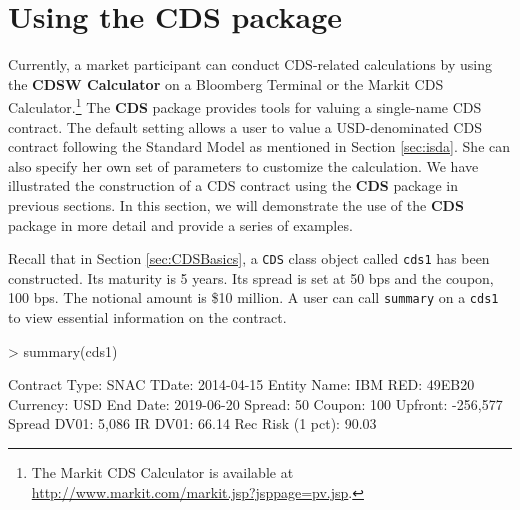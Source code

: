 \documentclass[a4paper]{article}
\renewenvironment{Schunk}{\vspace{\topsep}}{\vspace{\topsep}}
\begin{document}
\section{Using the CDS package}

Currently, a market participant can conduct CDS-related calculations
by using the \textbf{CDSW Calculator} on a Bloomberg Terminal or the
Markit CDS Calculator.\footnote{The Markit CDS Calculator is available
  at \url{http://www.markit.com/markit.jsp?jsppage=pv.jsp}.} The
\textbf{CDS} package provides tools for valuing a single-name CDS
contract. The default setting allows a user to value a USD-denominated
CDS contract following the Standard Model as mentioned in Section
\ref{sec:isda}. She can also specify her own set of parameters to
customize the calculation. We have illustrated the construction of a
CDS contract using the \textbf{CDS} package in previous sections. In
this section, we will demonstrate the use of the \textbf{CDS} package
in more detail and provide a series of examples.

Recall that in Section \ref{sec:CDSBasics}, a \texttt{CDS} class
object called \texttt{cds1} has been constructed. Its maturity is 5
years. Its spread is set at 50 bps and the coupon, 100 bps. The
notional amount is \$10 million. A user can call \texttt{summary} on a
\texttt{cds1} to view essential information on the contract.

\begin{Schunk}
\begin{Sinput}
> summary(cds1)
\end{Sinput}
\begin{Soutput}
Contract Type:                      SNAC   TDate:                     2014-04-15
Entity Name:                         IBM   RED:                           49EB20
Currency:                            USD   End Date:                  2019-06-20
Spread:                               50   Coupon:                           100
Upfront:                        -256,577   Spread DV01:                    5,086
IR DV01:                           66.14   Rec Risk (1 pct):               90.03
\end{Soutput}
\end{Schunk}

\end{document}
